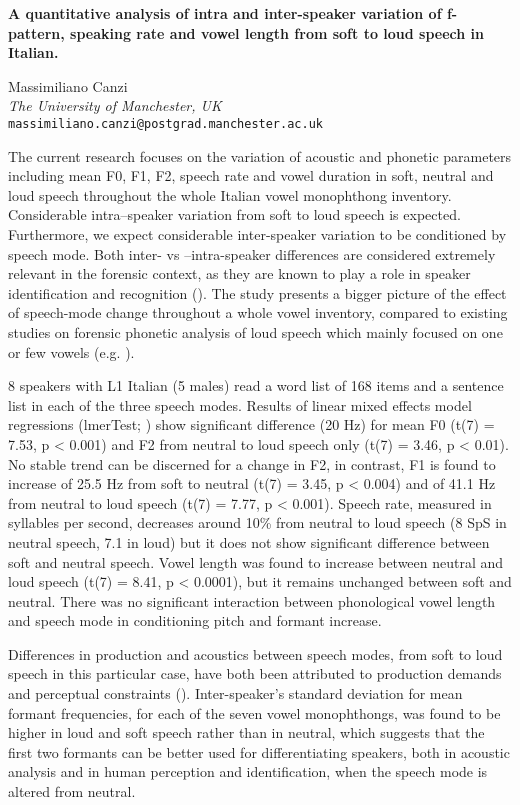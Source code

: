 \documentclass[12pt,a4paper,]{article}
\date{}
\begin{document}
\pagestyle{empty}

\begin{center}
\textbf{A quantitative analysis of intra and inter-speaker variation of f-pattern, speaking rate and vowel length from soft to loud speech in Italian.}

Massimiliano Canzi \\
\textit{The University of Manchester, UK} \\
\texttt{massimiliano.canzi@postgrad.manchester.ac.uk}
\end{center}

The current research focuses on the variation of acoustic and phonetic parameters including mean F0, F1, F2, speech rate and vowel duration in soft, neutral and loud speech throughout the whole Italian vowel monophthong inventory. Considerable intra–speaker variation from soft to loud speech is expected. Furthermore, we expect considerable inter-speaker variation to be conditioned by speech mode. Both inter- vs –intra-speaker differences are considered extremely relevant in the forensic context, as they are known to play a role in speaker identification and recognition (\citealt{Remez-1997}). The study presents a bigger picture of the effect of speech-mode change throughout a whole vowel inventory, compared to existing studies on forensic phonetic analysis of loud speech which mainly focused on one or few vowels (e.g. \citealt{Elliot-2000}).

8 speakers with L1 Italian (5 males) read a word list of 168 items and a sentence list in each of the three speech modes. Results of linear mixed effects model regressions (lmerTest; \citealt{Kuznetsova-2015}) show significant difference (20 Hz) for mean F0 (t(7) = 7.53, p < 0.001) and F2 from neutral to loud speech only (t(7) = 3.46, p < 0.01). No stable trend can be discerned for a change in F2, in contrast, F1 is found to increase of 25.5 Hz from soft to neutral (t(7) = 3.45, p < 0.004) and of 41.1 Hz from neutral to loud speech (t(7) = 7.77, p < 0.001). Speech rate, measured in syllables per second, decreases around 10\% from neutral to loud speech (8 SpS in neutral speech, 7.1 in loud) but it does not show significant difference between soft and neutral speech. Vowel length was found to increase between neutral and loud speech (t(7) = 8.41, p < 0.0001), but it remains unchanged between soft and neutral. There was no significant interaction between phonological vowel length and speech mode in conditioning pitch and formant increase.

Differences in production and acoustics between speech modes, from soft to loud speech in this particular case, have both been attributed to production demands and perceptual constraints (\citealt{Schulman-1989}). Inter-speaker’s standard deviation for mean formant frequencies, for each of the seven vowel monophthongs, was found to be higher in loud and soft speech rather than in neutral, which suggests that the first two formants can be better used for differentiating speakers, both in acoustic analysis and in human perception and identification, when the speech mode is altered from neutral.

\small
\vspace{-1.5em}


\end{document}
